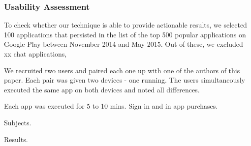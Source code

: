 \subsubsection{Usability Assessment}
To check whether our technique is able to provide actionable results, we selected 100 applications that persisted in the list of the top 500 popular applications on Google Play between November 2014 and May 2015. Out of these, we excluded xx chat applications, 


We recruited two users and paired each one up with one of the authors of this paper.  Each pair was given two devices - one running. 
The users simultaneously executed the same app on both devices and noted all differences.

Each app was executed for 5 to 10 mins. Sign in and in app purchases.

Subjects.

Results.




